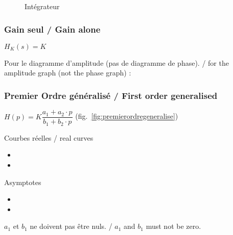 \documentclass[a4paper,12pt]{article}                      %
\newcommand{\TradEnLigne}[2]{
#1 / {\color{blue}#2}
}
\begin{document}
\begin{figure}[!htb]
\centering
\begin{tikzexample}[title=,righthand width=0.55\textwidth,] 
\end{tikzexample}
\caption{Intégrateur}
\label{fig:integrateur}
\end{figure}




\subsubsection{\TradEnLigne{Gain seul}{Gain alone}}

$H_K(s)=K$ 

\TradEnLigne{Pour le diagramme d'amplitude (pas de diagramme de phase).}{for the amplitude graph (not the phase graph) }:\\


\subsubsection{\TradEnLigne{Premier Ordre généralisé}{First order generalised }}
$H(p)=K\dfrac{a_1+a_2\cdot p}{b_1+b_2\cdot p}$ (fig.~\ref{fig:premierordregeneralise})


\TradEnLigne{Courbes réelles}{real curves}
\begin{itemize}
\item  {} 
\item  {}
\end{itemize}

Asymptotes
\begin{itemize}
\item  {}
\item  {}  
\end{itemize}



\TradEnLigne{$a_1$  et $b_1$  ne doivent pas être nuls.}{$a_1$  and  $b_1$ must not be zero.}
\end{document}
